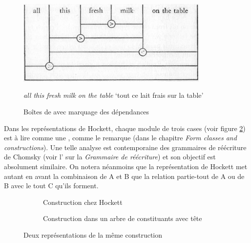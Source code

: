 {    \begin{figure}[H]
        \includegraphics[width=9.5cm]{figures/vol1syntaxe2-img025.png}
        \caption{Boîtes de \cites [188]{hockett1958course} avec marquage des dépendances\label{fig:hockett2}}
        \textit{all this fresh milk on the table} ‘tout ce lait frais sur la table’
    \end{figure}

 
    Dans les représentations de Hockett, chaque module de trois cases (voir figure \ref{fig:hockett3}) est à lire comme une , comme le remarque \citet[161]{hockett1958course} (dans le chapitre \textit{Form classes and constructions}). Une telle analyse est contemporaine des grammaires de réécriture de Chomsky (voir l’ sur la \textit{Grammaire de réécriture}) et son objectif est absolument similaire. On notera néanmoins que la représentation de Hockett met autant en avant la combinaison de A et B que la relation partie-tout de A ou de B avec le tout C qu’ils forment.

    \begin{figure}[H]
    \begin{subfigure}[t]{.5\textwidth}\centering
    \caption{Construction chez Hockett}
    \end{subfigure}\begin{subfigure}[t]{.5\textwidth}\centering
        \caption{Construction dans un arbre de constituants avec tête}
    \end{subfigure}
    \caption{{Deux représentations de la même construction}\label{fig:hockett3}}
    \end{figure}   

}

